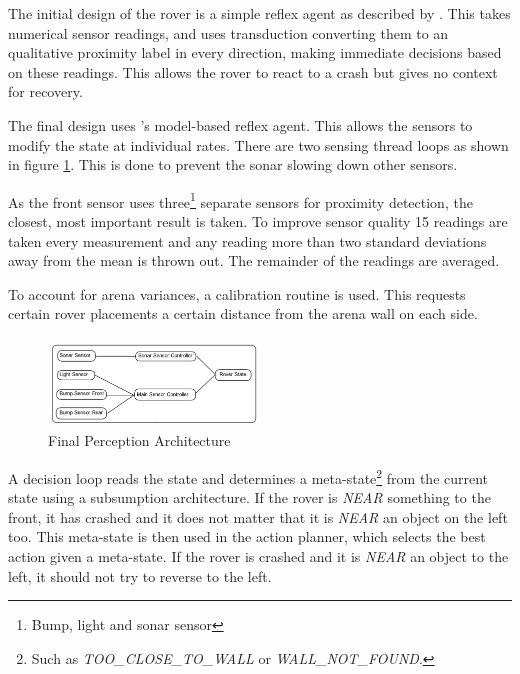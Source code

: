\documentclass[a4paper,12pt,twocolumn]{report}
\begin{document}

The initial design of the rover is a simple reflex agent as described by \cite{russell1995modern}. This takes numerical sensor readings, and uses transduction converting them to an qualitative proximity label in every direction, making immediate decisions based on these readings. This allows the rover to react to a crash but gives no context for recovery.

The final design uses \cite{russell1995modern}'s model-based reflex agent. This allows the sensors to modify the state at individual rates. There are two sensing thread loops as shown in figure \ref{fig:perception}. This is done to prevent the sonar slowing down other sensors.

As the front sensor uses three\footnote{Bump, light and sonar sensor} separate sensors for proximity detection, the closest, most important result is taken. To improve sensor quality 15 readings are taken every measurement and any reading more than two standard deviations away from the mean is thrown out. The remainder of the readings are averaged.

To account for arena variances, a calibration routine is used. This requests certain rover placements a certain distance from the arena wall on each side.

\begin{figure}
 \includegraphics[width=0.5\textwidth]{sensing-diagram}
 \caption{Final Perception Architecture}
 \label{fig:perception}
\end{figure}

A decision loop reads the state and determines a meta-state\footnote{Such as \emph{TOO\_CLOSE\_TO\_WALL} or \emph{WALL\_NOT\_FOUND}.} from the current state using a subsumption architecture. If the rover is \emph{NEAR} something to the front, it has crashed and it does not matter that it is \emph{NEAR} an object on the left too. This meta-state is then used in the action planner, which selects the best action given a meta-state. If the rover is crashed and it is \emph{NEAR} an object to the left, it should not try to reverse to the left.
\end{document}
